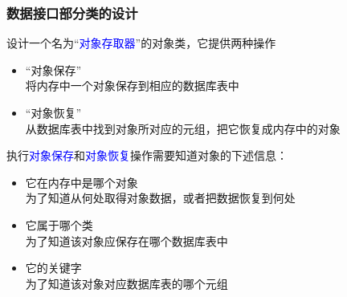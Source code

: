 \documentclass[compress]{beamer}
\begin{document}
\begin{frame}
{    \centering{}%
    \raisebox{3cm}{\qquad\alert{$\Longrightarrow$}\qquad}%
  }
\end{frame}

\begin{frame}
  \frametitle{数据接口部分类的设计}

   {
  设计一个名为“\textcolor{blue}{对象存取器}”的对象类，它提供两种操作
  \begin{itemize}
    \item “对象保存” \\
  将内存中一个对象保存到相应的数据库表中
    \item “对象恢复” \\
  从数据库表中找到对象所对应的元组，把它恢复成内存中的对象
  \end{itemize}
  }

   {
    执行\textcolor{blue}{对象保存}和\textcolor{blue}{对象恢复}操作需要知道对象的下述信息：
    \begin{itemize}
      \item 它在内存中是哪个对象 \\
    为了知道从何处取得对象数据，或者把数据恢复到何处
      \item 它属于哪个类 \\
    为了知道该对象应保存在哪个数据库表中
      \item 它的关键字 \\
    为了知道该对象对应数据库表的哪个元组 
    \end{itemize}
  }

\end{frame}
\end{document}
